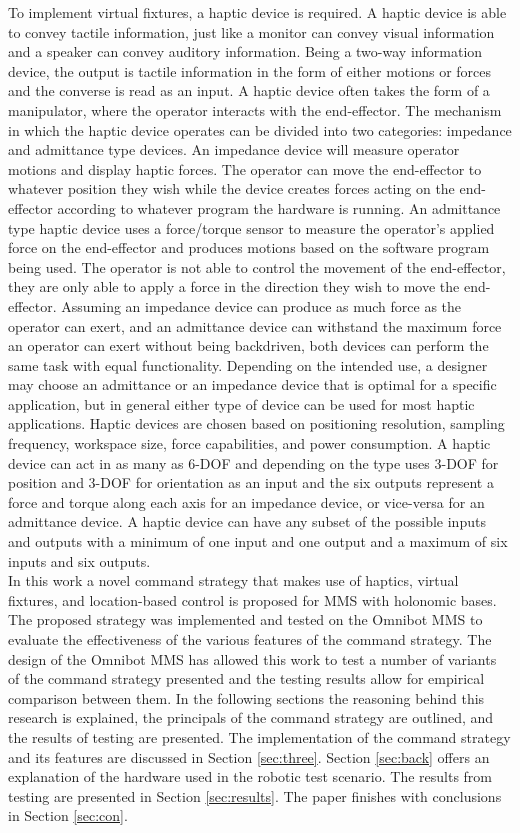 \documentclass[onecolumn,10pt,final]{asme2ej}
\begin{document}
To implement virtual fixtures, a haptic device is required. A haptic device is able to convey tactile information, just like a monitor can convey visual information and a speaker can convey auditory information. Being a two-way information device, the output is tactile information in the form of either motions or forces and the converse is read as an input. A haptic device often takes the form of a manipulator, where the operator interacts with the end-effector. The mechanism in which the haptic device operates can be divided into two categories: impedance and admittance type devices. An impedance device will measure operator motions and display haptic forces. The operator can move the end-effector to whatever position they wish while the device creates forces acting on the end-effector according to whatever program the hardware is running. An admittance type haptic device uses a force/torque sensor to measure the operator's applied force on the end-effector and produces motions based on the software program being used. The operator is not able to control the movement of the end-effector, they are only able to apply a force in the direction they wish to move the end-effector. Assuming an impedance device can produce as much force as the operator can exert, and an admittance device can withstand the maximum force an operator can exert without being backdriven, both devices can perform the same task with equal functionality. Depending on the intended use, a designer may choose an admittance or an impedance device that is optimal for a specific application, but in general either type of device can be used for most haptic applications. Haptic devices are chosen based on positioning resolution, sampling frequency, workspace size, force capabilities, and power consumption. A haptic device can act in as many as 6-DOF and depending on the type uses 3-DOF for position and 3-DOF for orientation as an input and the six outputs represent a force and torque along each axis for an impedance device, or vice-versa for an admittance device. A haptic device can have any subset of the possible inputs and outputs with a minimum of one input and one output and a maximum of six inputs and six outputs.\\

In this work a novel command strategy that makes use of haptics, virtual fixtures, and location-based control is proposed for MMS with holonomic bases. The proposed strategy was implemented and tested on the Omnibot MMS to evaluate the effectiveness of the various features of the command strategy. The design of the Omnibot MMS has allowed this work to test a number of variants of the command strategy presented and the testing results allow for empirical comparison between them. In the following sections the reasoning behind this research is explained, the principals of the command strategy are outlined, and the results of testing are presented. The implementation of the command strategy and its features are discussed in Section \ref{sec:three}. Section \ref{sec:back} offers an explanation of the hardware used in the robotic test scenario. The results from testing are presented in Section \ref{sec:results}. The paper finishes with conclusions in Section \ref{sec:con}.
\end{document}
